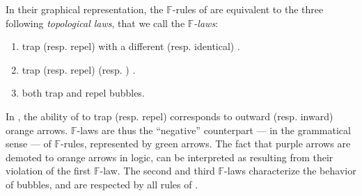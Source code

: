 \begin{description}
  In their graphical representation, the  $\mathbb{F}$-rules of
   are equivalent to the three following \emph{topological laws},
  that we call the \emph{$\mathbb{F}$-laws}:
  \begin{fact}
    \sbr
    \begin{enumerate}
      \item {}  trap (resp. repel)  with a different (resp.
      identical) .
      \item {}  trap (resp. repel)  (resp. ) .
      \item {}  both trap and repel  bubbles.
    \end{enumerate}
  \end{fact}
  In , the ability of  to trap (resp. repel)
   corresponds to outward (resp. inward) orange arrows. $\mathbb{F}$-laws
  are thus the ``negative'' counterpart --- in the grammatical sense --- of
  $\mathbb{F}$-rules, represented by green arrows. The fact that purple arrows
  are demoted to orange arrows in  logic, can be interpreted as
  resulting from their violation of the first $\mathbb{F}$-law. The second and
  third $\mathbb{F}$-laws characterize the behavior of  bubbles, and are
  respected by all rules of .
  

\end{description}
